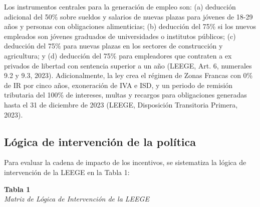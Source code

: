 \documentclass[12pt,spanish]{article}
\begin{document}
Los instrumentos centrales para la generación de empleo son: (a)
deducción adicional del 50\% sobre sueldos y salarios de nuevas plazas
para jóvenes de 18-29 años y personas con obligaciones alimenticias; (b)
deducción del 75\% si los nuevos empleados son jóvenes graduados de
universidades o institutos públicos; (c) deducción del 75\% para nuevas
plazas en los sectores de construcción y agricultura; y (d) deducción
del 75\% para empleadores que contraten a ex privados de libertad con
sentencia superior a un año (LEEGE, Art. 6, numerales 9.2 y 9.3, 2023).
Adicionalmente, la ley crea el régimen de Zonas Francas con 0\% de IR
por cinco años, exoneración de IVA e ISD, y un periodo de remisión
tributaria del 100\% de intereses, multas y recargos para obligaciones
generadas hasta el 31 de diciembre de 2023 (LEEGE, Disposición
Transitoria Primera, 2023).

\subsection{Lógica de intervención de la
política}\label{luxf3gica-de-intervenciuxf3n-de-la-poluxedtica}

Para evaluar la cadena de impacto de los incentivos, se sistematiza la
lógica de intervención de la LEEGE en la Tabla 1:

\textbf{Tabla 1}\\
\emph{Matriz de Lógica de Intervención de la LEEGE}
\end{document}
